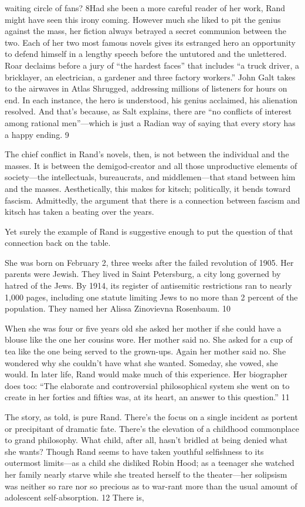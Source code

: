 waiting circle of fans? 8Had she been a more careful reader of her work, Rand might have seen this irony coming. However much she liked to pit the genius against the mass, her fiction always betrayed a secret communion between the two. Each of her two most famous novels gives its estranged hero an opportunity to defend himself in a lengthy speech before the untutored and the unlettered. Roar declaims before a jury of “the hardest faces” that includes “a truck driver, a bricklayer, an electrician, a gardener and three factory workers.” John Galt takes to the airwaves in Atlas Shrugged, addressing millions of listeners for hours on end. In each instance, the hero is understood, his genius acclaimed, his alienation resolved. And that’s because, as Salt explains, there are “no conflicts of interest among rational men”—which is just a Radian way of saying that every story has a happy ending. {\color{blue} 9 } {\par} The chief conflict in Rand’s novels, then, is not between the individual and the masses. It is between the demigod-creator and all those unproductive elements of society—the intellectuals, bureaucrats, and middlemen—that stand between him and the masses. Aesthetically, this makes for kitsch; politically, it bends toward fascism. Admittedly, the argument that there is a connection between fascism and kitsch has taken a beating over the years.{\par} Yet surely the example of Rand is suggestive enough to put the question of that connection back on the table.{\par} She was born on February 2, three weeks after the failed revolution of 1905. Her parents were Jewish. They lived in Saint Petersburg, a city long governed by hatred of the Jews. By 1914, its register of antisemitic restrictions ran to nearly 1,000 pages, including one statute limiting Jews to no more than {\color{blue} 2 } percent of the population. They named her Alissa Zinovievna Rosenbaum. {\color{blue} 10 } {\par} When she was four or five years old she asked her mother if she could have a blouse like the one her cousins wore. Her mother said no. She asked for a cup of tea like the one being served to the grown-ups. Again her mother said no. She wondered why she couldn’t have what she wanted. Someday, she vowed, she would. In later life, Rand would make much of this experience. Her biographer does too: “The elaborate and controversial philosophical system she went on to create in her forties and fifties was, at its heart, an answer to this question.” {\color{blue} 11 } {\par} The story, as told, is pure Rand. There’s the focus on a single incident as portent or precipitant of dramatic fate. There’s the elevation of a childhood commonplace to grand philosophy. What child, after all, hasn’t bridled at being denied what she wants? Though Rand seems to have taken youthful selfishness to its outermost limits—as a child she disliked Robin Hood; as a teenager she watched her family nearly starve while she treated herself to the theater—her solipsism was neither so rare nor so precious as to war-rant more than the usual amount of adolescent self-absorption. {\color{blue} 12 } There is, 